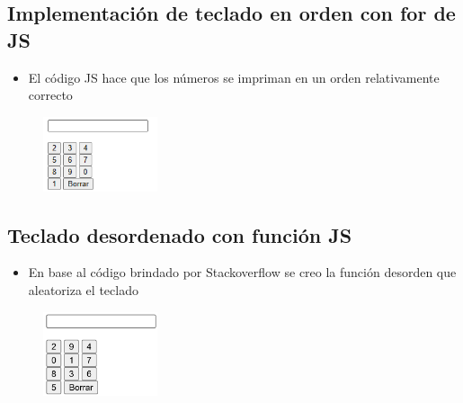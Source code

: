 \documentclass{article}
\begin{document}
	\subsection{Implementación de teclado en orden con for de JS}
	
	\begin{itemize}	
		\item El código JS hace que los números se impriman en un orden relativamente correcto
	\end{itemize}
	
	\begin{figure}[H]
		\centering
		\includegraphics[width=0.3\textwidth,keepaspectratio]{img/calc01.png}
	\end{figure}
\subsection{Teclado desordenado con función JS}
	
	\begin{itemize}	
		\item En base al código brindado por Stackoverflow se creo la
		 función desorden que aleatoriza el teclado
	\end{itemize}
	
	\begin{figure}[H]
		\centering
		\includegraphics[width=0.3\textwidth,keepaspectratio]{img/calc02.png}
	\end{figure}
\end{document}
